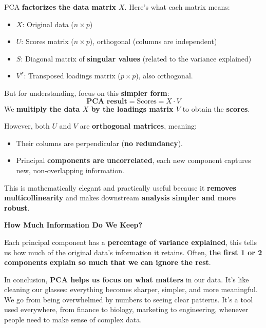 PCA \textbf{factorizes the data matrix $X$}. Here's what each matrix means:
\begin{itemize}
    \item $X$: Original data ($n \times p$)
    \item $U$: Scores matrix ($n \times p$), orthogonal (columns are independent)
    \item $S$: Diagonal matrix of \textbf{singular values} (related to the variance explained)
    \item $V^{T}$: Transposed loadings matrix ($p \times p$), also orthogonal.
\end{itemize}
But for understanding, focus on this \textbf{simpler form}:
\begin{equation*}
    \textbf{PCA result} = \text{Scores} = X \cdot V
\end{equation*}
We \textbf{multiply the data $X$ by the loadings matrix $V$} to obtain the \textbf{scores}.

\highspace
However, both $U$ and $V$ are \textbf{orthogonal matrices}, meaning:
\begin{itemize}
    \item Their columns are perpendicular (\textbf{no redundancy}).
    \item Principal \textbf{components are uncorrelated}, each new component captures new, non-overlapping information.
\end{itemize}
This is mathematically elegant and practically useful because it \textbf{removes multicollinearity} and makes downstream \textbf{analysis simpler and more robust}.

\highspace
\begin{flushleft}
    \textcolor{Green3}{ \textbf{How Much Information Do We Keep?}}
\end{flushleft}
Each principal component has a \textbf{percentage of variance explained}, this tells us how much of the original data's information it retains. Often, \textbf{the first 1 or 2 components explain so much that we can ignore the rest}.

\highspace
In conclusion, \textbf{PCA helps us focus on what matters} in our data. It's like cleaning our glasses: everything becomes sharper, simpler, and more meaningful. We go from being overwhelmed by numbers to seeing clear patterns. It's a tool used everywhere, from finance to biology, marketing to engineering, whenever people need to make sense of complex data.